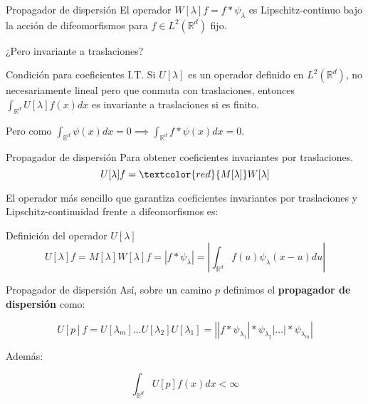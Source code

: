 \documentclass[aspectratio=43]{beamer}
\begin{document}
\begin{frame}{Propagador de dispersión}
  El operador $W[\lambda]f=f\ast \psi_\lambda$ es Lipschitz-continuo bajo la acción de difeomorfismos para $f \in L^2(\mathbb{R}^d)$ fijo. 

  \medskip

  \textcolor{tudCyan}{¿Pero invariante a traslaciones?}

  \medskip

  \begin{alertblock}{Condición para coeficientes I.T.}
    Si $U[\lambda]$ es un operador definido en $L^2(\mathbb{R}^d)$, no necesariamente lineal pero que conmuta con traslaciones, entonces $\int_{\mathbb{R}^d} U[\lambda]f(x)dx$ es invariante a traslaciones si es finito.
  \end{alertblock}
  \medskip
  Pero como $\int_{\mathbb{R}^d} \psi(x)dx=0 \implies \int_{\mathbb{R}^d} f \ast \psi(x) dx=0$. 
\end{frame}

\begin{frame}{Propagador de dispersión}
  Para obtener coeficientes invariantes por traslaciones. 
  $$U[\lambda]f= \textcolor{red}{M[\lambda]} W[\lambda]$$

  \medskip

  El operador más sencillo que garantiza coeficientes invariantes por traslaciones y Lipschitz-continuidad frente a difeomorfismos es:

  \begin{block}{Definición del operador $U[\lambda]$}
    $$U[\lambda]f=M[\lambda]W[\lambda]f=|f \ast \psi_\lambda|=\left | \int_{\mathbb{R}^d} f(u)\psi_\lambda(x-u) du \right|$$
  \end{block}
\end{frame}

\begin{frame}{Propagador de dispersión}
  Así, sobre un camino $p$ definimos el \textbf{propagador de dispersión} como: 

  $$  U[p]f=U[\lambda_m] \ldots U[\lambda_2]U[\lambda_1]=\left| |f \ast \psi_{\lambda_1} | \ast \psi_{\lambda_2} | \ldots | \ast \psi_{\lambda_m} \right|
  $$

  \medskip

  Además:

  $$ \int_{\mathbb{R}^d} U[p]f(x)dx < \infty $$
\end{frame}
\end{document}
